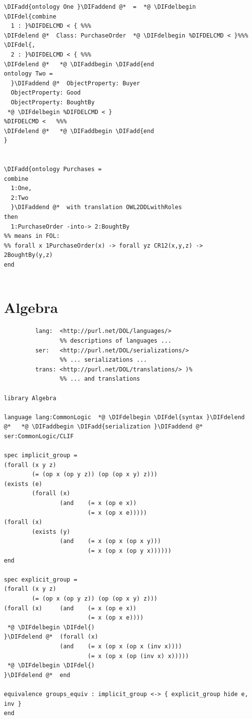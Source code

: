 \documentclass[10pt,fleqn,final]{scrreprt}
\newcommand{\sclause}[1]{\section{#1}}
\providecommand{\DIFadd}[1]{{\protect\color{blue}\uwave{#1}}} %
\providecommand{\DIFdel}[1]{{\protect\color{red}\sout{#1}}}                      %
\providecommand{\DIFaddbegin}{} %
\providecommand{\DIFaddend}{} %
\providecommand{\DIFdelbegin}{} %
\providecommand{\DIFdelend}{} %
\begin{document}
\begin{lstlisting}[basicstyle=\ttfamily,language=dolText,alsolanguage=OWL2manchester,escapechar=@,mathescape]
\DIFadd{ontology One }\DIFaddend @*  =  *@ \DIFdelbegin \DIFdel{combine
  1 : }%DIFDELCMD < { %%%
\DIFdelend @*  Class: PurchaseOrder  *@ \DIFdelbegin %DIFDELCMD < }%%%
\DIFdel{,
  2 : }%DIFDELCMD < { %%%
\DIFdelend @*   *@ \DIFaddbegin \DIFadd{end
ontology Two =
  }\DIFaddend @*  ObjectProperty: Buyer
  ObjectProperty: Good
  ObjectProperty: BoughtBy
 *@ \DIFdelbegin %DIFDELCMD < }
%DIFDELCMD <   %%%
\DIFdelend @*   *@ \DIFaddbegin \DIFadd{end
}


\DIFadd{ontology Purchases =
combine
  1:One,
  2:Two
  }\DIFaddend @*  with translation OWL2DDLwithRoles
then
  1:PurchaseOrder -into-> 2:BoughtBy
%% means in FOL: 
%% forall x 1PurchaseOrder(x) -> forall yz CR12(x,y,z) -> 2BoughtBy(y,z)
end


\end{lstlisting}


\sclause{Algebra}\DIFaddbegin \label{ex:algebra}
\DIFaddend 


\begin{lstlisting}[basicstyle=\ttfamily,language=dolText,alsolanguage=clif,escapechar=@,mathescape]
%DIF > prefix( :      <http://www.example.org/algebra#>
         lang:  <http://purl.net/DOL/languages/>
                %% descriptions of languages ...
         ser:   <http://purl.net/DOL/serializations/>
                %% ... serializations ...
         trans: <http://purl.net/DOL/translations/> )%
                %% ... and translations

library Algebra

language lang:CommonLogic  *@ \DIFdelbegin \DIFdel{syntax }\DIFdelend @*   *@ \DIFaddbegin \DIFadd{serialization }\DIFaddend @*  ser:CommonLogic/CLIF

spec implicit_group =
(forall (x y z)
        (= (op x (op y z)) (op (op x y) z)))
(exists (e)
        (forall (x)
                (and    (= x (op e x))
                        (= x (op x e)))))
(forall (x)
        (exists (y)
                (and    (= x (op x (op x y)))
                        (= x (op x (op y x))))))
end

spec explicit_group =
(forall (x y z)
        (= (op x (op y z)) (op (op x y) z)))
(forall (x)     (and    (= x (op e x))
                        (= x (op x e))))
 *@ \DIFdelbegin \DIFdel{)
}\DIFdelend @*  (forall (x)
                (and    (= x (op x (op x (inv x))))
                        (= x (op x (op (inv x) x)))))
 *@ \DIFdelbegin \DIFdel{)
}\DIFdelend @*  end

equivalence groups_equiv : implicit_group <-> { explicit_group hide e, inv }
end
\end{lstlisting}
\end{document}
